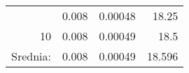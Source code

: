 \documentclass{article}
\begin{document}
\begin{table}[htbp]
\begin{tabular}{lrrr}
      \rowcolor[rgb]{ .929,  .929,  .929} \multicolumn{1}{r}{\textcolor[rgb]{ .482,  .482,  .482}{9}} & \textcolor[rgb]{ .482,  .482,  .482}{0.008} & \textcolor[rgb]{ .482,  .482,  .482}{0.00048} & \textcolor[rgb]{ .482,  .482,  .482}{18.25} \\
      \multicolumn{1}{r}{\textcolor[rgb]{ .482,  .482,  .482}{10}} & \textcolor[rgb]{ .482,  .482,  .482}{0.008} & \textcolor[rgb]{ .482,  .482,  .482}{0.00049} & \textcolor[rgb]{ .482,  .482,  .482}{18.5} \\
      \rowcolor[rgb]{ .929,  .929,  .929} \textcolor[rgb]{ .482,  .482,  .482}{Srednia:} & \textcolor[rgb]{ .482,  .482,  .482}{0.008} & \textcolor[rgb]{ .482,  .482,  .482}{0.00049} & \textcolor[rgb]{ .482,  .482,  .482}{18.596} \\

      \end{tabular}%
    \label{tab:addlabel}%
  \end{table}%
  
\end{document}
